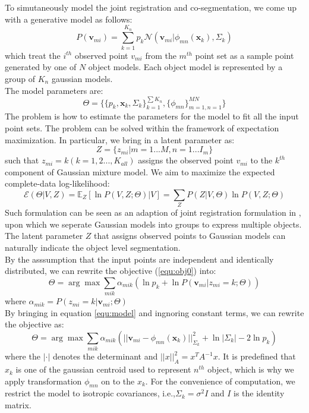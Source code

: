 To simutaneously model the joint registration and co-segmentation,  we come up with a generative model as follows:
\begin{equation}
\label{equ:model}
P(\pmb{v}_{mi})=\sum^{K_n}_{k=1}p_k\mathcal{N}(\pmb{v}_{mi}|\phi_{mn}(\pmb{x}_k),\Sigma_k)
\end{equation}
which treat the $i^{th}$ observed point $v_{mi}$ from the $m^{th}$ point set as a sample point generated by one of $N$ object models.
Each object model is represented by a group of $K_n$ gaussian models.\\
The model parameters are:
$$\Theta=\{\{p_k,\pmb x_k,\Sigma_k\}_{k=1}^{\sum{K_n}},\{\phi_{mn}\}_{m=1,n=1}^{MN}\}$$
The problem is how to estimate the parameters for the model to fit all the input point sets. The problem can be solved within the framework of expectation maximization. In particular, we bring in a latent parameter as:\\
$$Z=\{z_{mi}|m=1...M,n=1...I_m\}$$
such that $z_{mi}=k(k=1,2...,K_{all})$ assigns the observed point $v_{mi}$ to the $k^{th}$ component of Gaussian mixture model. We aim to maximize the expected complete-data log-likelihood:
\begin{equation}
\label{equ:obj0}
\mathcal{E}(\Theta|V,Z)=\mathbb{E}_Z[\ln P(V,Z;\Theta)|V]={\sum_ZP(Z|V,\Theta)\ln{P(V,Z;\Theta)}}
\end{equation}
Such formulation can be seen as an adaption of joint registration formulation in \cite{Evangelidis2014}, upon which we seperate Gaussian models into groups to express multiple objects. The latent parameter $Z$ that assigns observed points to Gaussian models can naturally indicate the object level segmentation.\\
By the asssumption that the input points are independent and identically distributed, we can rewrite the objective (\ref{equ:obj0}) into:
\begin{equation}
\label{equ:obj2}
\Theta=\arg\max\sum_{mik}\alpha_{mik}(\ln p_k + \ln P(\pmb v_{mi}|z_{mi}=k;\Theta))
\end{equation}
where $\alpha_{mik} = P( z_{mi} = k | \pmb v_{mi} ; \Theta )$\\
By bringing in equation \ref{equ:model} and ingnoring constant terms, we can rewrite the objective as:
\begin{equation}
\label{equ:obj3}
\Theta=\arg\max\sum_{mik}\alpha_{mik}(||\pmb v_{mi}-\phi_{mn}(\pmb x_k)||_{\Sigma_k}^2 + \ln |\Sigma_k| - 2\ln p_k)
\end{equation}
where the $|\cdot|$ denotes the determinant and $||x||_A^2=x^TA^{-1}x$. It is predefined that $x_k$ is one of the gaussian centroid used to represent $n^{th}$ object, which is why we apply transformation $\phi_{mn}$ on to the $x_k$. For the convenience of computation, we restrict the model to isotropic covariances, i.e.,$\Sigma_k=\sigma^2I$ and $I$ is the identity matrix.\\
